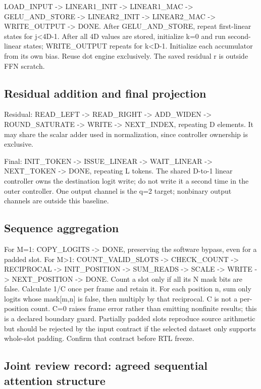 \documentclass[11pt,a4paper]{article}
\begin{document}
LOAD\_INPUT -> LINEAR1\_INIT -> LINEAR1\_MAC -> GELU\_AND\_STORE -> LINEAR2\_INIT -> LINEAR2\_MAC -> WRITE\_OUTPUT -> DONE. After GELU\_AND\_STORE, repeat first-linear states for j<4D-1. After all 4D values are stored, initialize k=0 and run second-linear states; WRITE\_OUTPUT repeats for k<D-1. Initialize each accumulator from its own bias. Reuse dot engine exclusively. The saved residual r is outside FFN scratch.

\subsection{Residual addition and final projection}

Residual: READ\_LEFT -> READ\_RIGHT -> ADD\_WIDEN -> ROUND\_SATURATE -> WRITE -> NEXT\_INDEX, repeating D elements. It may share the scalar adder used in normalization, since controller ownership is exclusive.

Final: INIT\_TOKEN -> ISSUE\_LINEAR -> WAIT\_LINEAR -> NEXT\_TOKEN -> DONE, repeating L tokens. The shared D-to-1 linear controller owns the destination logit write; do not write it a second time in the outer controller. One output channel is the q=2 target; nonbinary output channels are outside this baseline.

\subsection{Sequence aggregation}

For M=1: COPY\_LOGITS -> DONE, preserving the software bypass, even for a padded slot.
For M>1: COUNT\_VALID\_SLOTS -> CHECK\_COUNT -> RECIPROCAL -> INIT\_POSITION -> SUM\_READS -> SCALE -> WRITE -> NEXT\_POSITION -> DONE. Count a slot only if all its N mask bits are false. Calculate 1/C once per frame and retain it. For each position n, sum only logits whose mask[m,n] is false, then multiply by that reciprocal. C is not a per-position count. C=0 raises frame error rather than emitting nonfinite results; this is a declared boundary guard. Partially padded slots reproduce source arithmetic but should be rejected by the input contract if the selected dataset only supports whole-slot padding. Confirm that contract before RTL freeze.

\subsection{Joint review record: agreed sequential attention structure}
\end{document}
